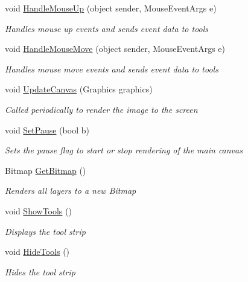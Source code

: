 \begin{DoxyCompactItemize}
void \mbox{\hyperlink{class_paint___program_1_1_canvas_a9e3612510a869438dad1e5bd0ec3870e}{Handle\+Mouse\+Up}} (object sender, Mouse\+Event\+Args e)
\begin{DoxyCompactList}\small\item\em Handles mouse up events and sends event data to tools \end{DoxyCompactList}\item 
void \mbox{\hyperlink{class_paint___program_1_1_canvas_a469df114198596cb65df4a22fcabc685}{Handle\+Mouse\+Move}} (object sender, Mouse\+Event\+Args e)
\begin{DoxyCompactList}\small\item\em Handles mouse move events and sends event data to tools \end{DoxyCompactList}\item 
void \mbox{\hyperlink{class_paint___program_1_1_canvas_addf9e6c4759c930a9aaba20125f66a24}{Update\+Canvas}} (Graphics graphics)
\begin{DoxyCompactList}\small\item\em Called periodically to render the image to the screen \end{DoxyCompactList}\item 
void \mbox{\hyperlink{class_paint___program_1_1_canvas_a3ba07590551cf4f24d942302e90db30f}{Set\+Pause}} (bool b)
\begin{DoxyCompactList}\small\item\em Sets the pause flag to start or stop rendering of the main canvas \end{DoxyCompactList}\item 
Bitmap \mbox{\hyperlink{class_paint___program_1_1_canvas_a1dad48a553831296e7920219e8614a6f}{Get\+Bitmap}} ()
\begin{DoxyCompactList}\small\item\em Renders all layers to a new Bitmap \end{DoxyCompactList}\item 
void \mbox{\hyperlink{class_paint___program_1_1_canvas_a8548f36df2fefafcbcc23d857592ddc6}{Show\+Tools}} ()
\begin{DoxyCompactList}\small\item\em Displays the tool strip \end{DoxyCompactList}\item 
void \mbox{\hyperlink{class_paint___program_1_1_canvas_a26985c4da349cdddbe1c91bfef8e1a10}{Hide\+Tools}} ()
\begin{DoxyCompactList}\small\item\em Hides the tool strip \end{DoxyCompactList}\item 

\end{DoxyCompactItemize}
